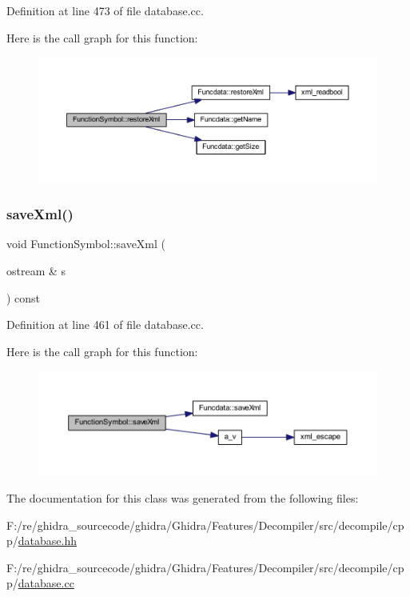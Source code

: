 Definition at line 473 of file database.\+cc.

Here is the call graph for this function\+:
\nopagebreak
\begin{figure}[H]
\begin{center}
\leavevmode
\includegraphics[width=350pt]{class_function_symbol_afba4e81eed1ad378ae7f0531ec8f3d2b_cgraph}
\end{center}
\end{figure}
\mbox{\label{class_function_symbol_a0947d5735918439e8de8f4e6084239f2}} 
\subsubsection{\texorpdfstring{saveXml()}{saveXml()}}
{\footnotesize\ttfamily void Function\+Symbol\+::save\+Xml (\begin{DoxyParamCaption}\item[{ostream \&}]{s }\end{DoxyParamCaption}) const\hspace{0.3cm}{\ttfamily [virtual]}}



Definition at line 461 of file database.\+cc.

Here is the call graph for this function\+:
\nopagebreak
\begin{figure}[H]
\begin{center}
\leavevmode
\includegraphics[width=350pt]{class_function_symbol_a0947d5735918439e8de8f4e6084239f2_cgraph}
\end{center}
\end{figure}


The documentation for this class was generated from the following files\+:\begin{DoxyCompactItemize}
\item 
F\+:/re/ghidra\+\_\+sourcecode/ghidra/\+Ghidra/\+Features/\+Decompiler/src/decompile/cpp/\mbox{\hyperlink{database_8hh}{database.\+hh}}\item 
F\+:/re/ghidra\+\_\+sourcecode/ghidra/\+Ghidra/\+Features/\+Decompiler/src/decompile/cpp/\mbox{\hyperlink{database_8cc}{database.\+cc}}\end{DoxyCompactItemize}
